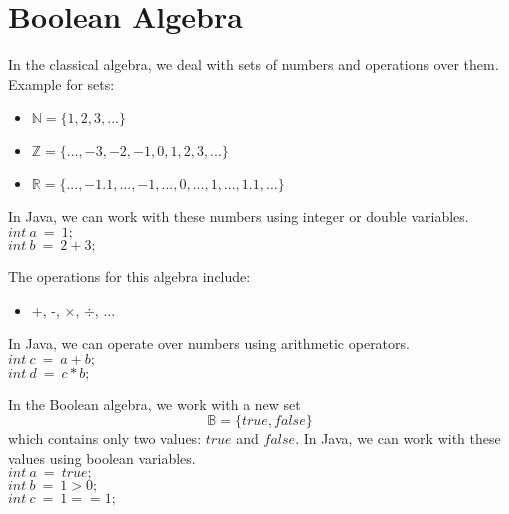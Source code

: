 \documentclass[a4paper]{article}
\begin{document}
	
	
	
	\section{Boolean Algebra}
	In the classical algebra, we deal with sets of numbers and operations over them. Example for sets:
	\begin{itemize}
		\item $\mathbb{N} = \{1, 2, 3, ...\}$
		\item $\mathbb{Z} = \{..., -3, -2, -1, 0, 1, 2, 3, ...\}$
		\item $\mathbb{R} = \{..., -1.1, ..., -1, ..., 0, ..., 1, ..., 1.1, ...\}$
	\end{itemize}

	In Java, we can work with these numbers using integer or double variables.\\
	$int\ a\ =\ 1;$\\
	$int\ b\ =\ 2 + 3;$
	
	The operations for this algebra include:
	\begin{itemize}
		\item +, -, $\times$, $\div$, ...
	\end{itemize}
	In Java, we can operate over numbers using arithmetic operators.\\
	$int\ c\ =\ a + b;$\\
	$int\ d\ =\ c * b;$\\
	
	\par
	In the Boolean algebra, we work with a new set 
	\begin{equation*}
		\mathbb{B} = \{true, false\}
	\end{equation*} which contains only two values: $true$ and $false$.
	In Java, we can work with these values using boolean variables.\\
	$int\ a\ =\ true;$\\
	$int\ b\ =\ 1 > 0;$\\
	$int\ c\ =\ 1 == 1;$
	
\end{document}
